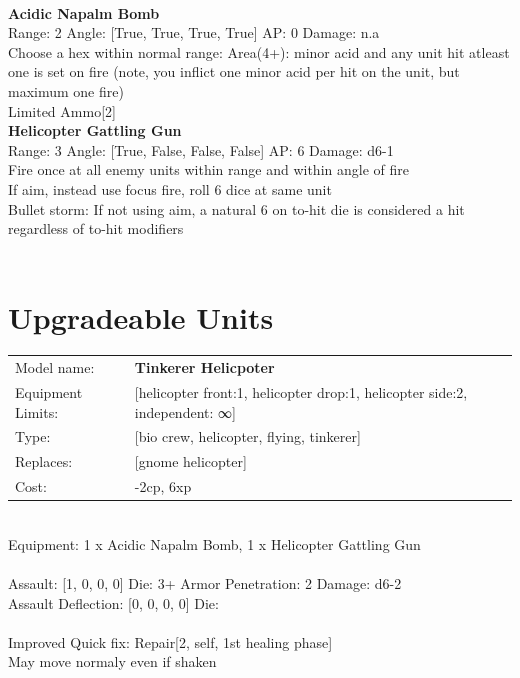 \ \\
{\bf Acidic Napalm Bomb } \\



Range: 2  Angle: [True, True, True, True] AP: 0 Damage: n.a \\
Choose a hex within normal range: Area(4+): minor acid and any unit hit atleast one is set on fire (note, you inflict one minor acid per hit on the unit, but maximum one fire)\\ 
Limited Ammo[2]\\ 




{\bf Helicopter Gattling Gun } \\



Range: 3  Angle: [True, False, False, False] AP: 6 Damage: d6-1 \\
Fire once at all enemy units within range and within angle of fire\\ 
If aim, instead use focus fire, roll 6 dice at same unit\\ 
Bullet storm: If not using aim, a natural 6 on to-hit die is considered a hit regardless of to-hit modifiers\\ 




 
\ \\













\section{Upgradeable Units}\noindent
\begin{tabular}{ll}
Model name: &{\bf Tinkerer Helicpoter } \\
Equipment Limits: &[helicopter front:1, helicopter drop:1, helicopter side:2, independent: ∞] \\
Type: &[bio crew, helicopter, flying, tinkerer] \\
Replaces: &[gnome helicopter] \\
Cost: & -2cp, 6xp\\
\end{tabular}
\ \\
Equipment: 1 x Acidic Napalm Bomb, 1 x Helicopter Gattling Gun \\
\ \\
Assault: [1, 0, 0, 0] Die: 3+ Armor Penetration: 2 Damage: d6-2 \\
Assault Deflection: [0, 0, 0, 0] Die: \\
\indent  
\ \\
Improved Quick fix: Repair[2, self, 1st healing phase]\\ 
May move normaly even if shaken\\ 

